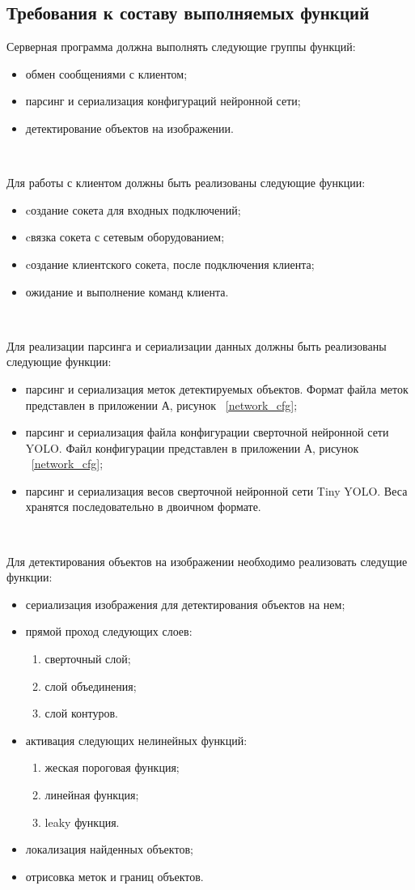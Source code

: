 \documentclass[a4paper,english]{G2-105}
\begin{document}
\subsection{Требования к составу выполняемых функций} \ttl
\par Серверная программа должна выполнять следующие группы функций:
\begin{itemize}
\item обмен сообщениями с клиентом;
\item парсинг и сериализация конфигураций нейронной сети;
\item детектирование объектов на изображении.
\end{itemize}
~\ 
\par Для работы с клиентом должны быть реализованы следующие функции:
\begin{itemize}
\item cоздание сокета для входных подключений;
\item cвязка сокета с сетевым оборудованием;
\item cоздание клиентского сокета, после подключения клиента;
\item ожидание и выполнение команд клиента.
\end{itemize}
~\ 
\par Для реализации парсинга и сериализации данных должны быть реализованы следующие функции:
\begin{itemize}
\item парсинг и сериализация меток детектируемых объектов. Формат файла меток представлен в приложении А, рисунок ~\ref{network_cfg};
\item парсинг и сериализация файла конфигурации сверточной нейронной сети YOLO. Файл конфигурации представлен в приложении А, рисунок ~\ref{network_cfg};
\item парсинг и сериализация весов сверточной нейронной сети Tiny YOLO. Веса хранятся последовательно в двоичном формате.
\end{itemize}
~\ 
\par Для детектирования объектов на изображении необходимо реализовать следущие функции:
\begin{itemize}
\item сериализация изображения для детектирования объектов на нем;
\item прямой проход следующих слоев:
\begin{enumerate}
\item сверточный слой;
\item слой объединения;
\item слой контуров.
\end{enumerate}
\item активация следующих нелинейных функций:
\begin{enumerate}
\item жеская пороговая функция;
\item линейная функция;
\item leaky функция.
\end{enumerate}
\item локализация найденных объектов;
\item отрисовка меток и границ объектов.
\end{itemize}
\end{document}
